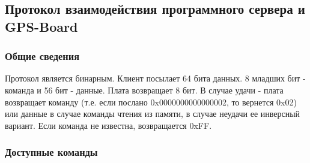 \subsection{Протокол взаимодействия программного сервера и GPS-Board}
\label{sec:binary_protocol}
\subsubsection{Общие сведения}
Протокол является бинарным. Клиент посылает 64 бита данных. 8 младших бит - команда и 56 бит - данные. Плата возвращает 8 бит. В случае
удачи - плата возвращает команду (т.е. если послано 0x0000000000000002, то вернется 0x02) или данные в случае команды чтения из
памяти, в случае неудачи ее инверсный вариант. Если команда не известна, возвращается 0xFF.

\subsubsection{Доступные команды}

